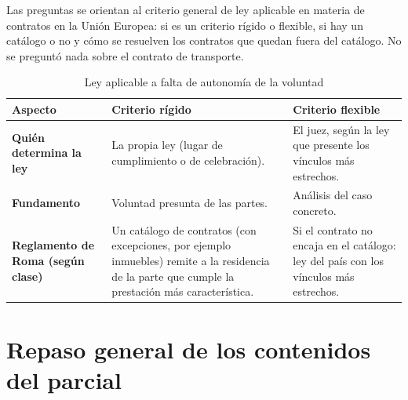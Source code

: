 \documentclass[12pt,oneside]{book}
\begin{document}
\begin{important}
Las preguntas se orientan al criterio general de ley aplicable en materia de contratos en la Unión Europea: si es un criterio rígido o flexible, si hay un catálogo o no y cómo se resuelven los contratos que quedan fuera del catálogo. No se preguntó nada sobre el contrato de transporte.
\end{important}

\begin{table}[H]
\centering
\small
\renewcommand{\arraystretch}{1.25}
\caption{Ley aplicable a falta de autonomía de la voluntad}
\begin{tabularx}{\textwidth}{L{0.20\textwidth}YY}
\toprule
\textbf{Aspecto} & \textbf{Criterio rígido} & \textbf{Criterio flexible} \\
\midrule
\textbf{Quién determina la ley} & La propia ley (lugar de cumplimiento o de celebración). & El juez, según la ley que presente los vínculos más estrechos. \\
\textbf{Fundamento} & Voluntad presunta de las partes. & Análisis del caso concreto. \\
\textbf{Reglamento de Roma (según clase)} & Un catálogo de contratos (con excepciones, por ejemplo inmuebles) remite a la residencia de la parte que cumple la prestación más característica. & Si el contrato no encaja en el catálogo: ley del país con los vínculos más estrechos. \\
\bottomrule
\end{tabularx}
\end{table}

\section{Repaso general de los contenidos del parcial}
\end{document}
